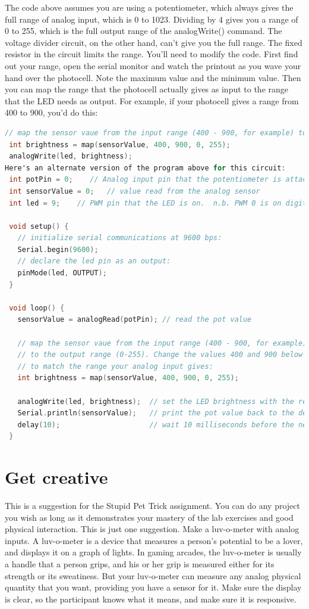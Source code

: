 The code above assumes you are using a potentiometer, which always gives the full range of analog input, which is 0 to 1023. Dividing by 4 gives you a range of 0 to 255, which is the full output range of the analogWrite() command. The voltage divider circuit, on the other hand, can't give you the full range. The fixed resistor in the circuit limits the range. You'll need to modify the code. First find out your range, open the serial monitor and watch the printout as you wave your hand over the photocell. Note the maximum value and the minimum value. Then you can map the range that the photocell actually gives as input to the range that the LED needs as output. For example, if your photocell gives a range from 400 to 900, you'd do this:


\begin{lstlisting}[language=C]
 // map the sensor vaue from the input range (400 - 900, for example) to the output range (0-255):
 int brightness = map(sensorValue, 400, 900, 0, 255);
 analogWrite(led, brightness);
Here's an alternate version of the program above for this circuit:
 int potPin = 0;    // Analog input pin that the potentiometer is attached to
 int sensorValue = 0;   // value read from the analog sensor
 int led = 9;    // PWM pin that the LED is on.  n.b. PWM 0 is on digital pin 9

 void setup() {
   // initialize serial communications at 9600 bps:
   Serial.begin(9600); 
   // declare the led pin as an output:
   pinMode(led, OUTPUT);
 }

 void loop() {
   sensorValue = analogRead(potPin); // read the pot value

   // map the sensor vaue from the input range (400 - 900, for example) 
   // to the output range (0-255). Change the values 400 and 900 below
   // to match the range your analog input gives:
   int brightness = map(sensorValue, 400, 900, 0, 255); 

   analogWrite(led, brightness);  // set the LED brightness with the result
   Serial.println(sensorValue);   // print the pot value back to the debugger pane
   delay(10);                     // wait 10 milliseconds before the next loop
 }
\end{lstlisting}

\section{Get creative}

This is a suggestion for the Stupid Pet Trick assignment. You can do any project you wish as long as it demonstrates your mastery of the lab exercises and good physical interaction. This is just one suggestion.
Make a luv-o-meter with analog inputs. A luv-o-meter is a device that measures a person's potential to be a lover, and displays it on a graph of lights. In gaming arcades, the luv-o-meter is usually a handle that a person grips, and his or her grip is measured either for its strength or its sweatiness. But your luv-o-meter can measure any analog physical quantity that you want, providing you have a sensor for it. Make sure the display is clear, so the participant knows what it means, and make sure it is responsive.


